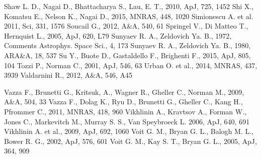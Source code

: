 \documentclass[a4paper,fleqn,usenatbib]{mnras}
\begin{document}
{\begin{thebibliography}{}
Shaw L. D., Nagai D., Bhattacharya S., Lau, E. T., 2010, ApJ, 725, 1452
Shi X., Komatsu E., Nelson K., Nagai D., 2015, MNRAS, 448, 1020
Simionescu A. et al. 2011, Sci, 331, 1576
Soucail G.,  2012, A\&A, 540, 61
Springel V., Di Matteo T., Hernquist L., 2005, ApJ, 620, L79
 Sunyaev R. A., Zeldovich Ya. B., 1972, Comments Astrophys. Space Sci., 4, 173
 Sunyaev R. A., Zeldovich Ya. B., 1980, ARA\&A, 18, 537
Su Y., Buote D., Gastaldello F., Brighenti F., 2015, ApJ,  805, 104
 Tozzi P., Norman C., 2001, ApJ, 546, 63
Urban O. et al., 2014, MNRAS, 437, 3939
Valdarnini R., 2012, A\&A, 546, A45

Vazza F., Brunetti G., Kritsuk, A., Wagner R., Gheller C., Norman M., 2009, A\&A, 504, 33
Vazza F., Dolag K., Ryu D., Brunetti G., Gheller C., Kang H., Pfrommer C., 2011, MNRAS, 418, 960
Vikhlinin A., Kravtsov A., Forman W., Jones C., Markevitch M., Murray S. S., Van Speybroeck L. 2006, ApJ, 640, 691
Vikhlinin A. et al., 2009, ApJ, 692, 1060
Voit G. M., Bryan G. L., Balogh M. L., Bower R. G., 2002, ApJ, 576, 601
Voit G. M., Kay S. T., Bryan G. L., 2005, ApJ, 364, 909


\end{thebibliography}}
\end{document}
